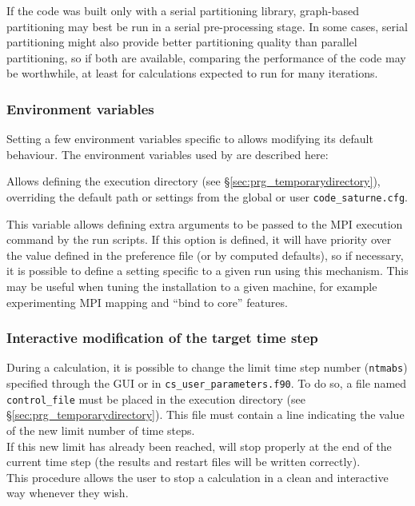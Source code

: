 {{{If the code was built only with a serial partitioning library,
graph-based partitioning may best be run in a serial pre-processing stage.
In some cases, serial partitioning might also provide better partitioning
quality than parallel partitioning, so if both are available, comparing
the performance of the code may be worthwhile, at least for calculations
expected to run for many iterations.

\subsubsection{Environment variables\label{sec:envcs}}

Setting a few environment variables specific to \CS allows modifying
its default behaviour. The environment variables used by \CS
are described here:


Allows defining the execution directory (see
\S\ref{sec:prg_temporarydirectory}),
overriding the default path or settings from the global
or user \texttt{code\_saturne.cfg}.


This variable allows defining extra arguments to be passed to
the MPI execution command by the run scripts.
If this option is defined, it will have priority over the value defined
in the preference file (or by computed defaults), so if necessary, it
is possible to define a setting specific to a given run using this
mechanism. This may be useful when tuning the installation to a given
machine, for example experimenting MPI mapping and ``bind to core''
features.

\subsubsection{Interactive modification of the target time step}
\label{sec:prg_control_file}%
During a calculation, it is possible to change the limit time step number
(\texttt{ntmabs}) specified through the GUI or in \texttt{cs\_user\_parameters.f90}.
To do so, a file named \texttt{control\_file} must be placed in the
execution directory (see \S\ref{sec:prg_temporarydirectory}).
This file must contain a line indicating the value of the new limit
number of time steps.\\
If this new limit has already been reached,
 \CS will stop
properly at the end of the current time step (the results and restart files
will be written correctly).\\
This procedure allows the user to stop a calculation in a clean and interactive
way whenever they wish.

}}}
